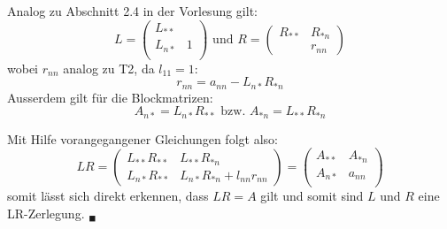 \documentclass[11pt]{article}
\theoremstyle{plain}
\theoremstyle{definition}
\renewcommand{\a}{\"{a}}
\renewcommand{\u}{\"{u}}
\begin{document}
Analog zu Abschnitt 2.4 in der Vorlesung gilt:
\begin{equation}
L = 
\begin{pmatrix}
L_{**} & 		\\
L_{n*} & 1 \\
\end{pmatrix}
\text{ und }
R = 
\begin{pmatrix}
R_{**} & R_{*n} \\
& r_{nn}
\end{pmatrix}
\end{equation}
wobei $r_{nn}$ analog zu T2, da $l_{11}=1$:
\begin{equation}
r_{nn} = a_{nn} - L_{n*}R_{*n}
\end{equation}
Ausserdem gilt f\u r die Blockmatrizen:
\begin{equation}
A_{n*}=L_{n*}R_{**}
\text{ bzw. } 
A_{*n}=L_{**}R_{*n}
\end{equation}


Mit Hilfe vorangegangener Gleichungen folgt also:
\begin{equation}
LR = 
\begin{pmatrix}
L_{**}R_{**} & L_{**}R_{*n} \\
L_{n*}R_{**} & L_{n*}R_{*n}+l_{nn}r_{nn}
\end{pmatrix}
=
\begin{pmatrix}
A_{**} & A_{*n} \\
A_{n*} & a_{nn}   \\
\end{pmatrix}
\end{equation}
somit l\a sst sich direkt erkennen, dass $LR=A$ gilt und somit sind $L$ und $R$ eine LR-Zerlegung. $_\blacksquare$
 
 
 
 
 
 
 
 
 
 
 
 
 
 
 
 
 
 
 
\end{document}
